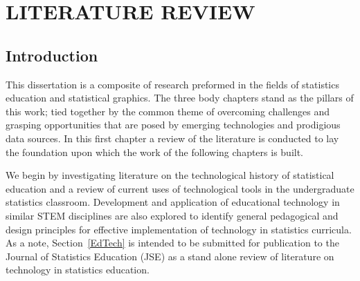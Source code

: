 \documentclass[11pt]{isuthesis}\usepackage[]{graphicx}\usepackage[]{color}
\begin{document}

% 
\tableofcontents
{} \cleardoublepage {}
{}
\listoftables
\cleardoublepage {} {}
\listoffigures
\cleardoublepage {}

\cleardoublepage {}

% 
\newpage
{}


\chapter{LITERATURE REVIEW}\label{litreview}

\section{Introduction}

This dissertation is a composite of research preformed in the fields of statistics education and statistical graphics. The three body chapters stand as the pillars of this work; tied together by the common theme of overcoming challenges and grasping opportunities that are posed by emerging technologies and prodigious data sources. In this first chapter a review of the literature is conducted to lay the foundation upon which the work of the following chapters is built. 

We begin by investigating literature on the technological history of statistical education and a review of current uses of technological tools in the undergraduate statistics classroom. Development and application of educational technology in similar STEM disciplines are also explored to identify general pedagogical and design principles for effective implementation of technology in statistics curricula. As a note, Section~\ref{EdTech} is intended to be submitted for publication to the Journal of Statistics Education (JSE) as a stand alone review of literature on technology in statistics education.
\end{document}
